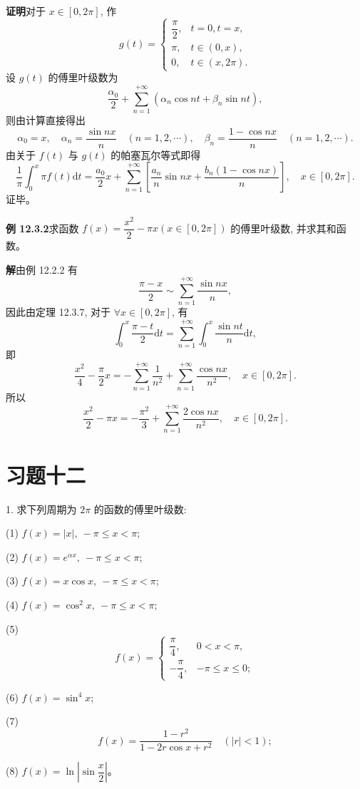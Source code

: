 \documentclass[UTF8,12pt,a4paper,fontset=fandol]{ctexart}
\begin{document}
\noindent\textbf{证明}\quad 对于 $x\in[0,2\pi]$, 作
\[
  g(t)=
  \begin{cases}
    \dfrac{\pi}{2}, & t=0,t=x,\\
    \pi, & t\in(0,x),\\
    0, & t\in(x,2\pi).
  \end{cases}
\]
设 $g(t)$ 的傅里叶级数为
\[
  \frac{\alpha_0}{2}+\sum_{n=1}^{+\infty}(\alpha_n\cos nt+\beta_n\sin nt),
\]
则由计算直接得出
\[
  \alpha_0=x,\quad
  \alpha_n=\frac{\sin nx}{n}\quad(n=1,2,\cdots),\quad
  \beta_n=\frac{1-\cos nx}{n}\quad(n=1,2,\cdots).
\]
由关于 $f(t)$ 与 $g(t)$ 的帕塞瓦尔等式即得
\[
  \frac1\pi\int_0^x\pi f(t)\mathrm dt
  =
  \frac{a_0}{2}x
  +\sum_{n=1}^{+\infty}
  \left[
    \frac{a_n}{n}\sin nx+\frac{b_n(1-\cos nx)}{n}
  \right],
  \quad x\in[0,2\pi].
\]
证毕。

\noindent\textbf{例 12.3.2}\quad 求函数 $f(x)=\dfrac{x^2}{2}-\pi x(x\in[0,2\pi])$ 的傅里叶级数, 并求其和函数。

\noindent\textbf{解}\quad 由例 12.2.2 有
\[
  \frac{\pi-x}{2}\sim\sum_{n=1}^{+\infty}\frac{\sin nx}{n},
\]
因此由定理 12.3.7, 对于 $\forall x\in[0,2\pi]$, 有
\[
  \int_0^x\frac{\pi-t}{2}\mathrm dt
  =
  \sum_{n=1}^{+\infty}\int_0^x\frac{\sin nt}{n}\mathrm dt,
\]
即
\[
  \frac{x^2}{4}-\frac{\pi}{2}x
  =
  -\sum_{n=1}^{+\infty}\frac1{n^2}
  +\sum_{n=1}^{+\infty}\frac{\cos nx}{n^2},\quad x\in[0,2\pi].
\]
所以
\[
  \frac{x^2}{2}-\pi x
  =
  -\frac{\pi^2}{3}+\sum_{n=1}^{+\infty}\frac{2\cos nx}{n^2},\quad x\in[0,2\pi].
\]

\section*{习题十二}

1. 求下列周期为 $2\pi$ 的函数的傅里叶级数:

(1) $f(x)=|x|,\ -\pi\leqslant x<\pi$;

(2) $f(x)=e^{\alpha x},\ -\pi\leqslant x<\pi$;

(3) $f(x)=x\cos x,\ -\pi\leqslant x<\pi$;

(4) $f(x)=\cos^2x,\ -\pi\leqslant x<\pi$;

(5)
\[
  f(x)=
  \begin{cases}
    \dfrac{\pi}{4}, & 0<x<\pi,\\
    -\dfrac{\pi}{4}, & -\pi\leqslant x\leqslant0;
  \end{cases}
\]

(6) $f(x)=\sin^4x$;

(7)
\[
  f(x)=\frac{1-r^2}{1-2r\cos x+r^2}\quad(|r|<1);
\]

(8) $f(x)=\ln\left|\sin\dfrac x2\right|$。
\end{document}
